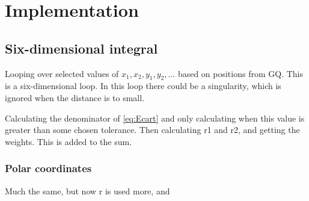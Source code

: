 \documentclass[11pt,a4paper,english,final]{article}
\numberwithin{equation}{section}
\begin{document}
\section{Implementation}
\subsection{Six-dimensional integral}
Looping over selected values of $x_1,x_2,y_1,y_2,\dots$ based on positions 
from GQ. This is a six-dimensional loop. In this loop there could be a 
singularity, which is ignored when the distance is to small.

Calculating the denominator of \eqref{eq:Ecart} and only calculating 
when this value is greater than some chosen tolerance. Then calculating 
r1 and r2, and getting the weights. This is added to the sum.

\subsubsection{Polar coordinates}
Much the same, but now r is used more, and 
\end{document}

